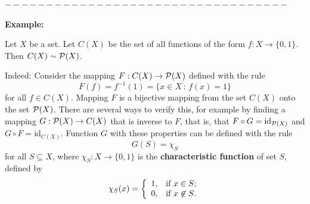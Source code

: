 \documentclass[11pt,paper=b5,footinclude,headinclude]{scrbook} %
\def\sledi {{~\Rightarrow~}}
\def\brez {{\,\setminus\,}}
\theoremstyle{remark}
\theoremstyle{definition} %
\theoremstyle{theorem} %
\begin{document}
\bigskip
$----------------------------------$
\bigskip

\textbf{ Example:}

Let $X$ be a set.
Let $C(X)$ be the set of all functions of the form $f: X\to \{0,1\}$.
Then $C(X)\sim {\cal P}(X)$.

Indeed:
Consider the mapping
$F:C(X)\to {\cal P}(X)$ defined with the rule
$$F(f) = f^{-1}(1) = \{x\in X\,:\,f(x) = 1\}$$
for all $f\in C(X)$.
Mapping $F$ is a bijective mapping from the set $C(X)$ onto the set ${\cal P}(X)$.
There are several ways to verify this, for example by finding a mapping
$G:{\cal P}(X)\to C(X)$ that is inverse to $F$, that is, that
$F\circ G = \textrm{id}_{{\cal P}(X)}$
and
$G\circ F = \textrm{id}_{C(X)}$.
Function $G$ with these properties can be defined with the rule
$$G(S) = \chi_S$$
for all $S\subseteq X$, where
${\chi_S}:X\to \{0,1\}$ is the \textbf{ characteristic function} of set $S$, defined by
$$\chi_S(x) = \left\{
  \begin{array}{ll}
              1, & \hbox{if  $x\in S$;} \\
              0, & \hbox{if $x\not\in S$.}
            \end{array}
          \right.$$
%
%
%
%
%
%
%
%
\end{document}
